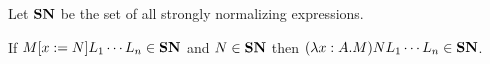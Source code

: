 
Let $\mathbf{SN}$ be the set of all strongly normalizing expressions.

\begin{lemma}
\label{lm:SN}
If $M[x:=N]L_1 \cdots L_n \in \mathbf{SN}$ and $N \in \mathbf{SN}$ then $(\lambda x:A.M)NL_1 \cdots L_n \in \mathbf{SN}$.

\end{lemma}
